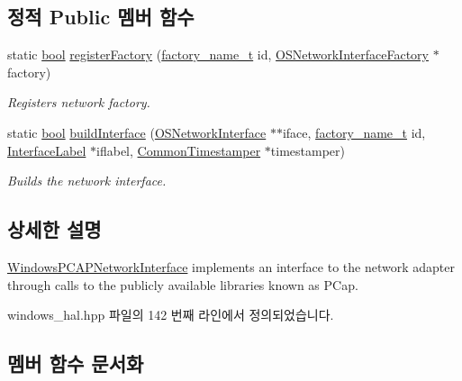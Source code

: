 \subsection*{정적 Public 멤버 함수}
\begin{DoxyCompactItemize}
\item 
static \hyperlink{avb__gptp_8h_af6a258d8f3ee5206d682d799316314b1}{bool} \hyperlink{class_o_s_network_interface_factory_a31c35b66fcf0061135c152be8e602acd}{register\+Factory} (\hyperlink{classfactory__name__t}{factory\+\_\+name\+\_\+t} id, \hyperlink{class_o_s_network_interface_factory}{O\+S\+Network\+Interface\+Factory} $\ast$factory)
\begin{DoxyCompactList}\small\item\em Registers network factory. \end{DoxyCompactList}\item 
static \hyperlink{avb__gptp_8h_af6a258d8f3ee5206d682d799316314b1}{bool} \hyperlink{class_o_s_network_interface_factory_a459ade6d7c1a3b8688bb8f982805077d}{build\+Interface} (\hyperlink{class_o_s_network_interface}{O\+S\+Network\+Interface} $\ast$$\ast$iface, \hyperlink{classfactory__name__t}{factory\+\_\+name\+\_\+t} id, \hyperlink{class_interface_label}{Interface\+Label} $\ast$iflabel, \hyperlink{class_common_timestamper}{Common\+Timestamper} $\ast$timestamper)
\begin{DoxyCompactList}\small\item\em Builds the network interface. \end{DoxyCompactList}\end{DoxyCompactItemize}


\subsection{상세한 설명}
\hyperlink{class_windows_p_c_a_p_network_interface}{Windows\+P\+C\+A\+P\+Network\+Interface} implements an interface to the network adapter through calls to the publicly available libraries known as P\+Cap. 

windows\+\_\+hal.\+hpp 파일의 142 번째 라인에서 정의되었습니다.



\subsection{멤버 함수 문서화}
